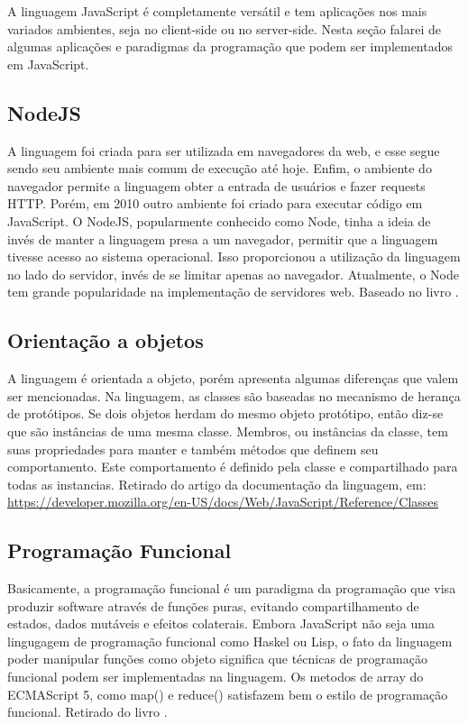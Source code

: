    A linguagem JavaScript é completamente versátil e tem aplicações nos mais variados ambientes, seja no client-side ou no server-side. 
   Nesta seção
   falarei de algumas aplicações e paradigmas da programação que podem ser implementados em JavaScript.

        \subsection{NodeJS}
        A linguagem foi criada para ser utilizada em navegadores da web, e esse segue sendo seu ambiente mais comum de execução até hoje. Enfim, o ambiente do navegador permite a linguagem obter a entrada de usuários e fazer requests HTTP. Porém, em 2010 outro ambiente foi criado para executar código em JavaScript. 
O NodeJS, popularmente conhecido como Node, tinha a ideia de invés de manter a linguagem presa a um navegador, 
permitir que a linguagem tivesse acesso ao sistema operacional. Isso proporcionou a utilização da linguagem no lado do servidor, invés de se limitar apenas ao navegador. Atualmente, o Node tem grande popularidade na implementação de servidores web.
Baseado no livro \cite{flanagan2020javascript}.
        \subsection{ Orienta\c{c}\~{a}o a objetos}
        A linguagem é orientada a objeto, porém apresenta algumas diferenças que valem ser mencionadas. 
        Na linguagem, as classes são baseadas no mecanismo de herança de protótipos. Se dois objetos herdam do mesmo objeto protótipo, então diz-se que são instâncias de uma mesma classe. 
        Membros, ou instâncias da classe, tem suas propriedades para manter e também métodos que definem seu comportamento. Este comportamento é definido pela classe e compartilhado para todas as instancias.
Retirado do artigo da documentação da linguagem, em: \url{https://developer.mozilla.org/en-US/docs/Web/JavaScript/Reference/Classes}
         \subsection{Programação Funcional}
         Basicamente, a programação funcional é um paradigma da programação que visa produzir software através de funções puras, 
         evitando compartilhamento de estados, dados mutáveis e efeitos colaterais.
         Embora JavaScript não seja uma lingugagem de programação funcional como Haskel ou Lisp, 
         o fato da linguagem poder manipular funções como objeto significa que técnicas de programação funcional podem ser implementadas na linguagem.
         Os metodos de array do ECMAScript 5, como map() e reduce() satisfazem bem o estilo de programação funcional. 
         Retirado do livro \cite{powers2015javascript}.
       